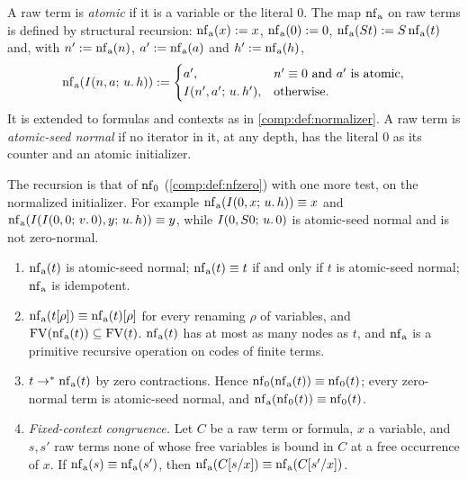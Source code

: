 \begin{definition}
\label{comp:def:nfatomic}
A raw term is \emph{atomic} if it is a variable or the literal $0$. The map
$\operatorname{nf}_{\mathrm a}$ on raw terms is defined by structural recursion:
$\operatorname{nf}_{\mathrm a}(x)\mathrel{:=} x$, $\operatorname{nf}_{\mathrm a}(0)\mathrel{:=}0$,
$\operatorname{nf}_{\mathrm a}(S t)\mathrel{:=}S\operatorname{nf}_{\mathrm a}(t)$ and, with
$n'\mathrel{:=}\operatorname{nf}_{\mathrm a}(n)$, $a'\mathrel{:=}\operatorname{nf}_{\mathrm a}(a)$ and
$h'\mathrel{:=}\operatorname{nf}_{\mathrm a}(h)$,
\[
 \operatorname{nf}_{\mathrm a}(I(n,a;\,u.\,h))\mathrel{:=}
 \begin{cases}
  a', & n'\equiv0\text{ and }a'\text{ is atomic},\\
  I(n',a';\,u.\,h'), & \text{otherwise}.
 \end{cases}
\]
It is extended to formulas and contexts as in \cref{comp:def:normalizer}. A
raw term is \emph{atomic-seed normal} if no iterator in it, at any depth, has
the literal $0$ as its counter and an atomic initializer.
\end{definition}

The recursion is that of $\operatorname{nf}_0$ (\cref{comp:def:nfzero}) with one more
test, on the normalized initializer. For example
$\operatorname{nf}_{\mathrm a}(I(0,x;\,u.\,h))\equiv x$ and
$\operatorname{nf}_{\mathrm a}(I(I(0,0;\,v.\,0),y;\,u.\,h))\equiv y$, while
$I(0,S0;\,u.\,0)$ is atomic-seed normal and is not zero-normal.

\begin{lemma}
\label{comp:lem:nfatomic}
\begin{enumerate}[label=(\alph*)]
\item $\operatorname{nf}_{\mathrm a}(t)$ is atomic-seed normal; $\operatorname{nf}_{\mathrm a}(t)\equiv t$
 if and only if $t$ is atomic-seed normal; $\operatorname{nf}_{\mathrm a}$ is idempotent.
\item $\operatorname{nf}_{\mathrm a}(t[\rho])\equiv\operatorname{nf}_{\mathrm a}(t)[\rho]$ for every
 renaming $\rho$ of variables, and
 $\operatorname{FV}(\operatorname{nf}_{\mathrm a}(t))\subseteq\operatorname{FV}(t)$. $\operatorname{nf}_{\mathrm a}(t)$ has at most
 as many nodes as $t$, and $\operatorname{nf}_{\mathrm a}$ is a primitive recursive
 operation on codes of finite terms.
\item $t\to^{*}\operatorname{nf}_{\mathrm a}(t)$ by zero contractions. Hence
 $\operatorname{nf}_0(\operatorname{nf}_{\mathrm a}(t))\equiv\operatorname{nf}_0(t)$; every zero-normal term is
 atomic-seed normal, and $\operatorname{nf}_{\mathrm a}(\operatorname{nf}_0(t))\equiv\operatorname{nf}_0(t)$.
\item \emph{Fixed-context congruence.} Let $C$ be a raw term or formula, $x$
 a variable, and $s,s'$ raw terms none of whose free variables is bound in
 $C$ at a free occurrence of $x$. If
 $\operatorname{nf}_{\mathrm a}(s)\equiv\operatorname{nf}_{\mathrm a}(s')$, then
 $\operatorname{nf}_{\mathrm a}(C[s/x])\equiv\operatorname{nf}_{\mathrm a}(C[s'/x])$.
\end{enumerate}
\end{lemma}

